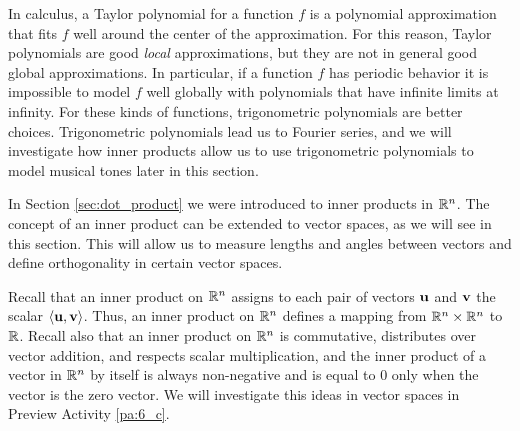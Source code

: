  \label{chap:inner_products}

\vspace*{-17 pt}

\vspace*{13 pt}

\label{sec:appl_fourier}

In calculus, a Taylor polynomial for a function $f$ is a polynomial approximation that fits $f$ well around the center of the approximation. For this reason, Taylor polynomials are good \emph{local} approximations, but they are not in general good global approximations. In particular, if a function $f$ has periodic behavior it is impossible to model $f$ well globally with polynomials that have infinite limits at infinity. For these kinds of functions, trigonometric polynomials are better choices. Trigonometric polynomials lead us to Fourier series, and we will investigate how inner products allow us to use trigonometric polynomials to model musical tones later in this section. 


\label{sec:inner_prod_intro}

In Section \ref{sec:dot_product} we were introduced to inner products in $\mathbb{R}^n$. The concept of an inner product can be extended to vector spaces, as we will see in this section. This will allow us to measure lengths and angles between vectors and define orthogonality in certain vector spaces. 

Recall that an inner product on $\mathbb{R}^n$ assigns to each pair of vectors $\mathbf{u}$ and $\mathbf{v}$ the scalar $\langle \mathbf{u}, \mathbf{v} \rangle$. Thus, an inner product on $\mathbb{R}^n$ defines a mapping from $\mathbb{R}^n \times \mathbb{R}^n$ to $\mathbb{R}$. Recall also that an inner product on $\mathbb{R}^n$ is commutative, distributes over vector addition, and respects scalar multiplication, and the inner product of a vector in $\mathbb{R}^n$  by itself is always non-negative and is equal to 0 only when the vector is the zero vector. We will investigate this ideas in vector spaces in Preview Activity \ref{pa:6_c}.  

